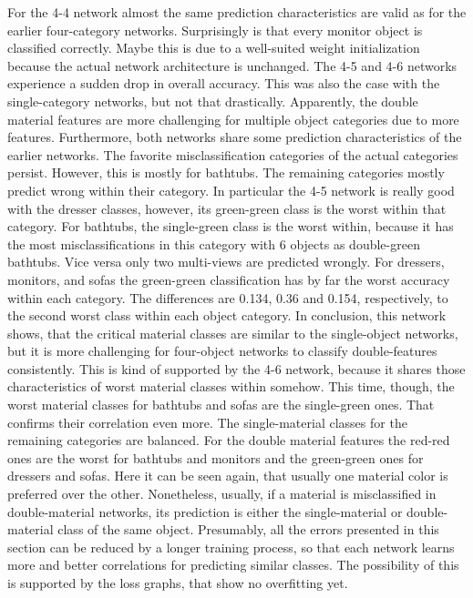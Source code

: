 For the 4-4 network almost the same prediction characteristics are valid as for the earlier four-category networks.
Surprisingly is that every monitor object is classified correctly.
Maybe this is due to a well-suited weight initialization because the actual network architecture is unchanged.
The 4-5 and 4-6 networks experience a sudden drop in overall accuracy.
This was also the case with the single-category networks, but not that drastically.
Apparently, the double material features are more challenging for multiple object categories due to more features.
Furthermore, both networks share some prediction characteristics of the earlier networks.
The favorite misclassification categories of the actual categories persist.
However, this is mostly for bathtubs.
The remaining categories mostly predict wrong within their category.
In particular the 4-5 network is really good with the dresser classes, however, its green-green class is the worst within that category.
For bathtubs, the single-green class is the worst within, because it has the most misclassifications in this category with 6 objects as double-green bathtubs.
Vice versa only two multi-views are predicted wrongly.
For dressers, monitors, and sofas the green-green classification has by far the worst accuracy within each category.
The differences are 0.134, 0.36 and 0.154, respectively, to the second worst class within each object category.
In conclusion, this network shows, that the critical material classes are similar to the single-object networks, but it is more challenging for four-object networks to classify double-features consistently.
This is kind of supported by the 4-6 network, because it shares those characteristics of worst material classes within somehow.
This time, though, the worst material classes for bathtubs and sofas are the single-green ones.
That confirms their correlation even more.
The single-material classes for the remaining categories are balanced.
For the double material features the red-red ones are the worst for bathtubs and monitors and the green-green ones for dressers and sofas.
Here it can be seen again, that usually one material color is preferred over the other.
Nonetheless, usually, if a material is misclassified in double-material networks, its prediction is either the single-material or double-material class of the same object.
Presumably, all the errors presented in this section can be reduced by a longer training process, so that each network learns more and better correlations for predicting similar classes.
The possibility of this is supported by the loss graphs, that show no overfitting yet.
